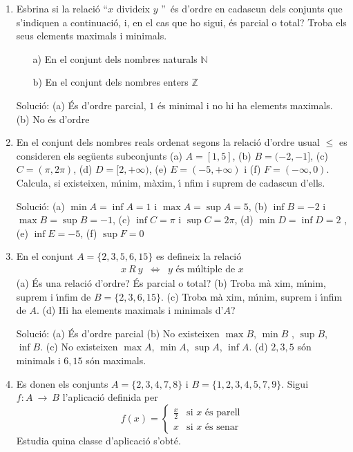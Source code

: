 \begin{enumerate}
\item Esbrina si la relaci\'{o} \textquotedblleft $x$ divideix $y$%
\textquotedblright\ \'{e}s d'ordre en cadascun dels conjunts que s'indiquen
a continuaci\'{o}, i, en el cas que ho sigui, \'{e}s parcial o total? Troba
els seus elements maximals i minimals.

\begin{enumerate}
\item[a)] En el conjunt dels nombres naturals $\mathbb{N}$

\item[b)] En el conjunt dels nombres enters $\mathbb{Z}$
\end{enumerate}

Soluci\'{o}: (a) \'{E}s d'ordre parcial, $1$ \'{e}s minimal i no hi ha
elements maximals. (b) No \'{e}s d'ordre

\item En el conjunt dels nombres reals ordenat segons la relaci\'{o} d'ordre
usual $\leq $ es consideren els seg\"{u}ents subconjunts (a) $A=[1,5]$, (b) $%
B=(-2,-1]$, (c) $C=(\pi ,2\pi )$, (d) $D=[2,+\infty )$, (e) $E=(-5,+\infty )$
i (f) $F=(-\infty ,0)$. Calcula, si existeixen, m\'{\i}nim, m\`{a}xim, \'{\i}%
nfim i suprem de cadascun d'ells.

Soluci\'{o}: (a) $\min A=\inf A=1$ i $\max A=\sup A=5$, (b) $\inf B=-2$ i $%
\max B=\sup B=-1$, (c) $\inf C=\pi $ i $\sup C=2\pi $, (d) $\min D=\inf D=2$%
, (e) $\inf E=-5$, (f) $\sup F=0$

\item En el conjunt $A=\{2,3,5,6,15\}$ es defineix la relaci\'{o}%
\begin{equation*}
\begin{array}{ccc}
x~R~y & \Longleftrightarrow & y\text{ \'{e}s m\'{u}ltiple de }x%
\end{array}%
\end{equation*}%
(a) \'{E}s una relaci\'{o} d'ordre? \'{E}s parcial o total? (b) Troba m\`{a}%
xim, m\'{\i}nim, suprem i \'{\i}nfim de $B=\{2,3,6,15\}$. (c) Troba m\`{a}%
xim, m\'{\i}nim, suprem i \'{\i}nfim de $A$. (d) Hi ha elements maximals i
minimals d'$A$?

Soluci\'{o}: (a) \'{E}s d'ordre parcial (b) No existeixen $\max B$, $\min B$%
, $\sup B$, $\inf B$. (c) No existeixen $\max A$, $\min A$, $\sup A$, $\inf
A $. (d) $2,3,5$ s\'{o}n minimals i $6,15$ s\'{o}n maximals.

\item Es donen els conjunts $A=\{2,3,4,7,8\}$ i $B=\{1,2,3,4,5,7,9\}$. Sigui
$f:A~\longrightarrow ~B$ l'aplicaci\'{o} definida per
\begin{equation*}
f(x)=\left\{
\begin{array}{ll}
\frac{x}{2} & \text{si \ }x\text{ \ \'{e}s parell} \\
x & \text{si \ }x\text{ \ \'{e}s senar}%
\end{array}%
\right.
\end{equation*}%
Estudia quina classe d'aplicaci\'{o} s'obt\'{e}.


\end{enumerate}
